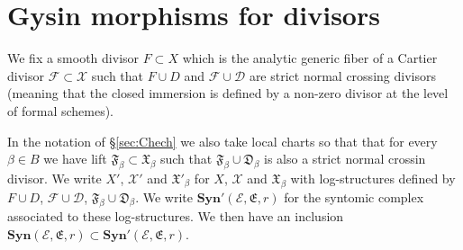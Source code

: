 \documentclass[asterisque,english]{smfart}
\begin{document}
\section{Gysin morphisms for divisors}\label{sec:Gysin}

We fix a smooth divisor $F\subset X$ which is the analytic generic fiber of a Cartier divisor $\mathcal{F}\subset \mathcal{X}$ such that $F\cup D$ and $\mathcal{F}\cup \mathcal{D}$ are strict normal crossing divisors (meaning that the closed immersion is defined by a non-zero divisor at the level of formal schemes). 

In the notation of \S \ref{sec:Chech} we also take local charts so that that for every $\beta\in B$ we have lift $\mathfrak{F}_\beta \subset \mathfrak{X}_\beta$ such that $\mathfrak{F}_\beta\cup \mathfrak{D}_\beta$ is also a strict normal crossin divisor.
We write $X'$, $\mathcal{X}'$ and $\mathfrak{X}'_\beta$ for $X$, $\mathcal{X}$ and $\mathfrak{X}_\beta$ with log-structures defined by $F\cup D$,  $\mathcal{F}\cup \mathcal{D}$, $\mathfrak{F}_\beta\cup \mathfrak{D}_\beta$. We write $\mathbf{Syn}'(\mathcal{E},\mathfrak{E},r)$ for the syntomic complex associated to these log-structures. We then have an inclusion $\mathbf{Syn}(\mathcal{E},\mathfrak{E},r)\subset \mathbf{Syn}'(\mathcal{E},\mathfrak{E},r)$. 
\end{document}
